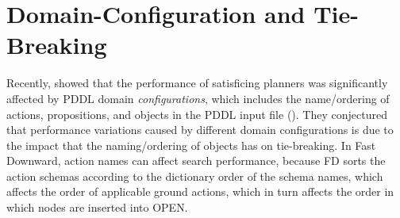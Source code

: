 

\section{Domain-Configuration and Tie-Breaking}
Recently, \citeauthor{vallati2015effective} showed that the performance of 
satisficing planners was significantly affected by PDDL domain \emph{configurations}, which includes the name/ordering of actions, propositions, and objects in the PDDL input file (\citeyear{vallati2015effective}).
They conjectured that performance variations caused
by different domain configurations is due to the impact that the naming/ordering of objects has on tie-breaking.
In Fast Downward, action names can affect search performance, because FD 
sorts the action schemas according to the dictionary
order of the schema names, which affects the order of applicable ground
actions, which in turn affects the order in which nodes
are inserted into OPEN.

